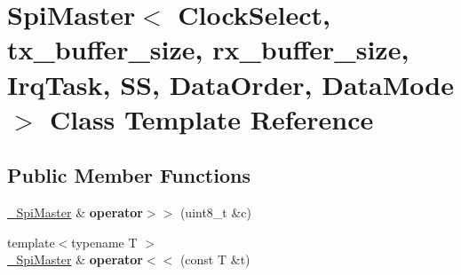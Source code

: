 \hypertarget{classSpiMaster}{}\section{Spi\+Master$<$ Clock\+Select, tx\+\_\+buffer\+\_\+size, rx\+\_\+buffer\+\_\+size, Irq\+Task, SS, Data\+Order, Data\+Mode $>$ Class Template Reference}
\label{classSpiMaster}
\subsection*{Public Member Functions}
\begin{DoxyCompactItemize}
\item 
\hyperlink{classSpiMaster}{\+\_\+\+Spi\+Master} \& {\bfseries operator$>$$>$} (uint8\+\_\+t \&c)\hypertarget{classSpiMaster_a2a50e37ac4a9f972265621a8fac114be}{}\label{classSpiMaster_a2a50e37ac4a9f972265621a8fac114be}

\item 
{\footnotesize template$<$typename T $>$ }\\\hyperlink{classSpiMaster}{\+\_\+\+Spi\+Master} \& {\bfseries operator$<$$<$} (const T \&t)\hypertarget{classSpiMaster_a14f96a6b4507097f6ae6f2a6cb118740}{}\label{classSpiMaster_a14f96a6b4507097f6ae6f2a6cb118740}

\end{DoxyCompactItemize}
